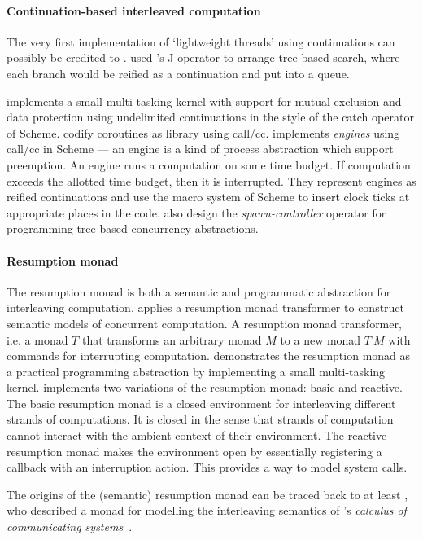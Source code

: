 \documentclass[12pt,phd,lfcs,twoside,openright,logo,leftchapter,normalheadings]{infthesis}
\theoremstyle{plain}
\theoremstyle{definition}
\begin{document}
\paragraph{Continuation-based interleaved computation}
The very first implementation of `lightweight threads' using
continuations can possibly be credited to
\citet{Burstall69}. \citeauthor{Burstall69} used
\citeauthor{Landin65}'s J operator to arrange tree-based search, where
each branch would be reified as a continuation and put into a
queue.

\citet{Wand80} implements a small multi-tasking kernel with support
for mutual exclusion and data protection using undelimited
continuations in the style of the catch operator of Scheme.
\citet{HaynesFW86} codify coroutines as library using call/cc.
\citet{DybvigH89} implements \emph{engines} using call/cc in Scheme
--- an engine is a kind of process abstraction which support
preemption. An engine runs a computation on some time budget. If
computation exceeds the allotted time budget, then it is
interrupted. They represent engines as reified continuations and use
the macro system of Scheme to insert clock ticks at appropriate places
in the code. \citet{HiebD90} also design the \emph{spawn-controller}
operator for programming tree-based concurrency abstractions.

\paragraph{Resumption monad}
The resumption monad is both a semantic and programmatic abstraction
for interleaving computation. \citet{Papaspyrou01} applies a
resumption monad transformer to construct semantic models of
concurrent computation. A resumption monad transformer, i.e. a monad
$T$ that transforms an arbitrary monad $M$ to a new monad $T~M$ with
commands for interrupting computation.
%
\citet{Harrison06} demonstrates the resumption monad as a practical
programming abstraction by implementing a small multi-tasking
kernel. \citeauthor{Harrison06} implements two variations of the
resumption monad: basic and reactive. The basic resumption monad is a
closed environment for interleaving different strands of
computations. It is closed in the sense that strands of computation
cannot interact with the ambient context of their environment. The
reactive resumption monad makes the environment open by essentially
registering a callback with an interruption action. This provides a
way to model system calls.

The origins of the (semantic) resumption monad can be traced back to
at least \citet{Moggi90}, who described a monad for modelling the
interleaving semantics of \citeauthor{Milner75}'s \emph{calculus of
  communicating systems}~\cite{Milner75}.
\end{document}
